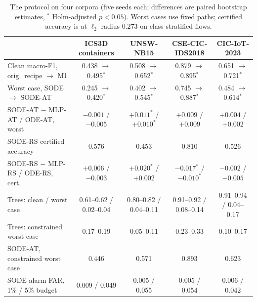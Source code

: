 \begin{table}[t]
\caption{The protocol on four corpora (five seeds each; differences are paired
bootstrap estimates, $^{*}$ Holm-adjusted $p<0.05$). Worst cases use fixed paths;
certified accuracy is at $\ell_2$ radius $0.273$ on class-stratified flows.}
\label{tab:generalisation}
\centering\scriptsize
\setlength{\tabcolsep}{3pt}
\begin{tabular}{lcccc}
\toprule
& ICS3D containers & UNSW-NB15 & CSE-CIC-IDS2018 & CIC-IoT-2023\\
\midrule
Clean macro-F1, orig.\ recipe $\to$ M1 & 0.438 $\to$ 0.495$^{*}$ & 0.508 $\to$ 0.652$^{*}$ & 0.879 $\to$ 0.895$^{*}$ & 0.651 $\to$ 0.721$^{*}$\\
Worst case, SODE $\to$ SODE-AT & 0.245 $\to$ 0.420$^{*}$ & 0.402 $\to$ 0.545$^{*}$ & 0.745 $\to$ 0.887$^{*}$ & 0.484 $\to$ 0.614$^{*}$\\
SODE-AT $-$ MLP-AT / ODE-AT, worst & $-0.001$ / $-0.005$ & $+0.011^{*}$ / $+0.010^{*}$ & $+0.009$ / $+0.009$ & $+0.004$ / $+0.002$\\
SODE-RS certified accuracy & 0.576 & 0.453 & 0.810 & 0.526\\
SODE-RS $-$ MLP-RS / ODE-RS, cert. & $+0.006$ / $-0.003$ & $+0.020^{*}$ / $+0.002$ & $-0.017^{*}$ / $-0.010^{*}$ & $-0.002$ / $-0.005$\\
Trees: clean / worst case & 0.61--0.62 / 0.02--0.04 & 0.80--0.82 / 0.04--0.11 & 0.91--0.92 / 0.08--0.14 & 0.91--0.94 / 0.04--0.17\\
Trees: constrained worst case & 0.17--0.19 & 0.05--0.11 & 0.23--0.33 & 0.10--0.17\\
SODE-AT, constrained worst case & 0.446 & 0.571 & 0.893 & 0.623\\
SODE alarm FAR, 1\% / 5\% budget & 0.009 / 0.049 & 0.005 / 0.055 & 0.005 / 0.054 & 0.006 / 0.042\\
\bottomrule
\end{tabular}
\end{table}


